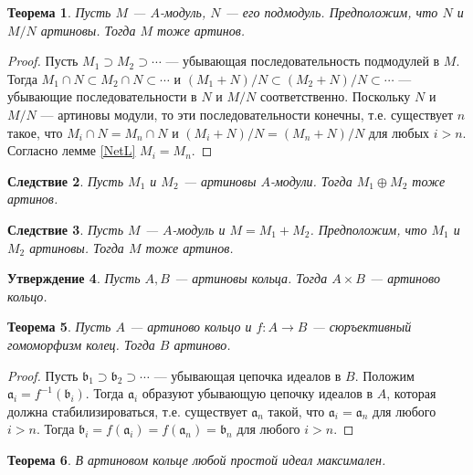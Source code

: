 \documentclass[12pt, titlepage, oneside]{amsbook}
\newcommand{\aaa}{\mathfrak{a}}
\newcommand{\bbb}{\mathfrak{b}}
\newtheorem{theorem}{Теорема}[chapter]
\newtheorem{corollary}[theorem]{Следствие}
\newtheorem{claim}[theorem]{Утверждение}
\theoremstyle{definition}
\theoremstyle{remark}
\begin{document}
\begin{theorem}
	\label{ArtM2}
	Пусть $M$ --- $A$-модуль, $N$ --- его подмодуль. Предположим, что $N$ и $M/N$ артиновы. Тогда $M$ тоже артинов.
\end{theorem}

\begin{proof}
	Пусть $M_1\supset M_2\supset\cdots$ --- убывающая последовательность подмодулей в $M$. Тогда $M_1\cap N\subset M_2\cap N\subset\cdots$ и $(M_1+N)/N\subset (M_2+N)/N\subset\cdots$ --- убывающие последовательности в $N$ и $M/N$ соответственно. Поскольку $N$ и $M/N$ --- артиновы модули, то эти последовательности конечны, т.е. существует $n$ такое, что $M_i\cap N=M_n\cap N$ и $(M_i+N)/N=(M_n+N)/N$ для любых $i>n$. Согласно лемме \ref{NetL} $M_i=M_n$.
\end{proof}

\begin{corollary}
	\label{ArtM3}
	Пусть $M_1$ и $M_2$ --- артиновы $A$-модули. Тогда $M_1\oplus M_2$ тоже артинов.
\end{corollary}

\begin{corollary}
	\label{ArtM4}
	Пусть $M$ --- $A$-модуль и $M=M_1+M_2$. Предположим, что $M_1$ и $M_2$ артиновы. Тогда $M$ тоже артинов.
\end{corollary}

\begin{claim}
	\label{Art1}
	Пусть $A,B$ --- артиновы кольца. Тогда $A\times B$ --- артиново кольцо.
\end{claim}

\begin{theorem}
	\label{Art2}
	Пусть $A$ --- артиново кольцо и $f\colon A\rightarrow B$ --- сюръективный гомоморфизм колец. Тогда $B$ артиново.
\end{theorem}

\begin{proof}
	Пусть $\bbb_1\supset\bbb_2\supset\cdots$ --- убывающая цепочка идеалов в $B$. Положим $\aaa_i=f^{-1}(\bbb_i)$. Тогда $\aaa_i$ образуют убывающую цепочку идеалов в $A$, которая должна стабилизироваться, т.е. существует $\aaa_n$ такой, что $\aaa_i=\aaa_n$ для любого $i>n$. Тогда $\bbb_i=f(\aaa_i)=f(\aaa_n)=\bbb_n$ для любого $i>n$.
\end{proof}

\begin{theorem}
	\label{Art3}
	В артиновом кольце любой простой идеал максимален.
\end{theorem}
\end{document}

